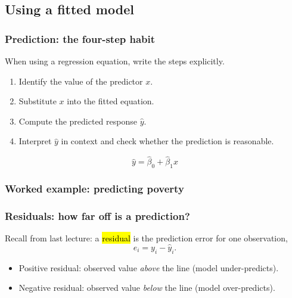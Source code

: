 \documentclass[slidestop,compress,mathserif]{beamer}
\begin{document}
\subsection{Using a fitted model}
\begin{frame}
\frametitle{Prediction: the four-step habit}

When using a regression equation, write the steps explicitly.

\begin{enumerate}
\item Identify the value of the predictor $x$.
\item Substitute $x$ into the fitted equation.
\item Compute the predicted response $\widehat{y}$.
\item Interpret $\widehat{y}$ in context and check whether the prediction is reasonable.
\end{enumerate}
$$\widehat{y}=\widehat{\beta}_0+\widehat{\beta}_1x$$

\end{frame}
\begin{frame}
\frametitle{Worked example: predicting poverty}
\end{frame}
\begin{frame}
\frametitle{Residuals: how far off is a prediction?}

Recall from last lecture: a \hl{residual} is the prediction error for one observation,
$$e_i=y_i-\widehat{y}_i.$$
\begin{itemize}
\item Positive residual: observed value \emph{above} the line (model under-predicts).
\item Negative residual: observed value \emph{below} the line (model over-predicts).
\end{itemize}


\end{frame}
\end{document}
